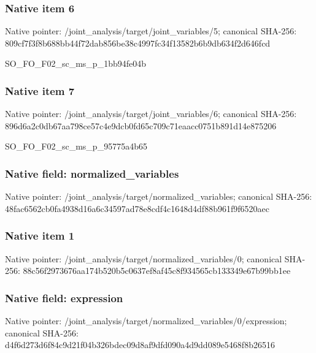 \documentclass[10pt,a4paper]{article}
\begin{document}
\subsubsection{Native item 6}
Native pointer: /joint\_\allowbreak{}analysis/target/joint\_\allowbreak{}variables/5; canonical SHA-256: 809cf7f3f8b688bb44f72dab856be38c4997fc34f13582b6b9db634f2d646fcd

\begingroup\raggedright\sloppy SO\_\allowbreak{}FO\_\allowbreak{}F02\_\allowbreak{}sc\_\allowbreak{}ms\_\allowbreak{}p\_\allowbreak{}1bb94fe04b\par\endgroup

\subsubsection{Native item 7}
Native pointer: /joint\_\allowbreak{}analysis/target/joint\_\allowbreak{}variables/6; canonical SHA-256: 896d6a2c0db67aa798ce57c4e9dcb0fd65c709c71eaacc0751b891d14e875206

\begingroup\raggedright\sloppy SO\_\allowbreak{}FO\_\allowbreak{}F02\_\allowbreak{}sc\_\allowbreak{}ms\_\allowbreak{}p\_\allowbreak{}95775a4b65\par\endgroup

\subsubsection{Native field: normalized\_\allowbreak{}variables}
Native pointer: /joint\_\allowbreak{}analysis/target/normalized\_\allowbreak{}variables; canonical SHA-256: 48fac6562cb0fa4938d16a6c34597ad78e8cdf4c1648d4df88b961f9f6520aec

\subsubsection{Native item 1}
Native pointer: /joint\_\allowbreak{}analysis/target/normalized\_\allowbreak{}variables/0; canonical SHA-256: 88c56f2973676aa174b520b5c0637ef8af45c8f934565cb133349e67b99bb1ee

\subsubsection{Native field: expression}
Native pointer: /joint\_\allowbreak{}analysis/target/normalized\_\allowbreak{}variables/0/expression; canonical SHA-256: d4f6d273d6f84c9d21f04b326bdec09d8af9dfd090a4d9dd089e5468f8b26516
\end{document}
